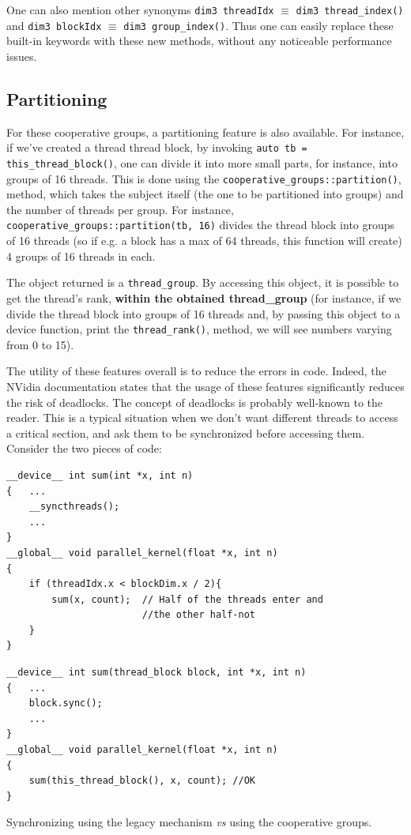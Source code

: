One can also mention other synonyms \verb|dim3 threadIdx| $ \equiv $ \verb|dim3 thread_index()| and \verb|dim3 blockIdx| $ \equiv $ \verb|dim3 group_index()|. Thus one can easily replace 
these built-in keywords with these new methods, without any noticeable performance issues.

\subsection*{Partitioning}
For these cooperative groups, a partitioning feature is also available. For instance, if 
we've created a thread thread block, by invoking \verb|auto tb = this_thread_block()|,
one can divide it into more small parts, for instance, into groups of 16 threads. 
This is done using the \verb|cooperative_groups::partition()|, method, which takes the 
subject itself (the one to be partitioned into groups) and the number of threads per group.
For instance, \verb|cooperative_groups::partition(tb, 16)| divides the thread block into 
groups of 16 threads (so if e.g. a block has a max of 64 threads, this function will create)
4 groups of 16 threads in each. 

The object returned is a \verb|thread_group|. By accessing this object, it is possible to get 
the thread's rank, \textbf{within the obtained thread\_group} (for instance, if we divide 
the thread block into groups of 16 threads and, by passing this object to a device function,
print the \verb|thread_rank()|, method, we will see numbers varying from 0 to 15). 

The utility of these features overall is to reduce the errors in code. Indeed, 
the NVidia documentation states that the usage of these features significantly reduces the 
risk of deadlocks. The concept of deadlocks is probably well-known to the reader. This is 
a typical situation when we don't want different threads to access a critical section, and 
ask them to be synchronized before accessing them. Consider the two pieces of code:

\begin{listing}[!ht]
\begin{verbatim}
__device__ int sum(int *x, int n) 
{   ...
    __syncthreads();
    ...
}
__global__ void parallel_kernel(float *x, int n)
{
    if (threadIdx.x < blockDim.x / 2){
        sum(x, count);  // Half of the threads enter and 
                        //the other half-not
    }                   
}
\end{verbatim}
\caption*{}
\label{deadlock}

\begin{verbatim}
__device__ int sum(thread_block block, int *x, int n) 
{   ...
    block.sync();
    ...
}
__global__ void parallel_kernel(float *x, int n)
{
    sum(this_thread_block(), x, count); //OK
}
\end{verbatim}
    \caption{Synchronizing using the legacy mechanism \textit{vs} using the cooperative groups. \cite{blog_2020}}
\label{nodeadlock}
\end{listing}

